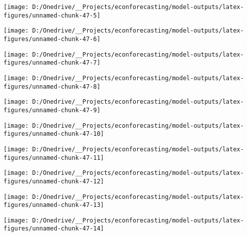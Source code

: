 \documentclass[11pt, letterpaper]{article}\usepackage[]{graphicx}\usepackage[]{color}
\begin{document}
{\centering \texttt{[image: D:/Onedrive/\_\_Projects/econforecasting/model-outputs/latex-figures/unnamed-chunk-47-5]} 

}




{\centering \texttt{[image: D:/Onedrive/\_\_Projects/econforecasting/model-outputs/latex-figures/unnamed-chunk-47-6]} 

}




{\centering \texttt{[image: D:/Onedrive/\_\_Projects/econforecasting/model-outputs/latex-figures/unnamed-chunk-47-7]} 

}




{\centering \texttt{[image: D:/Onedrive/\_\_Projects/econforecasting/model-outputs/latex-figures/unnamed-chunk-47-8]} 

}




{\centering \texttt{[image: D:/Onedrive/\_\_Projects/econforecasting/model-outputs/latex-figures/unnamed-chunk-47-9]} 

}




{\centering \texttt{[image: D:/Onedrive/\_\_Projects/econforecasting/model-outputs/latex-figures/unnamed-chunk-47-10]} 

}




{\centering \texttt{[image: D:/Onedrive/\_\_Projects/econforecasting/model-outputs/latex-figures/unnamed-chunk-47-11]} 

}




{\centering \texttt{[image: D:/Onedrive/\_\_Projects/econforecasting/model-outputs/latex-figures/unnamed-chunk-47-12]} 

}




{\centering \texttt{[image: D:/Onedrive/\_\_Projects/econforecasting/model-outputs/latex-figures/unnamed-chunk-47-13]} 

}




{\centering \texttt{[image: D:/Onedrive/\_\_Projects/econforecasting/model-outputs/latex-figures/unnamed-chunk-47-14]} 

}
\end{document}
